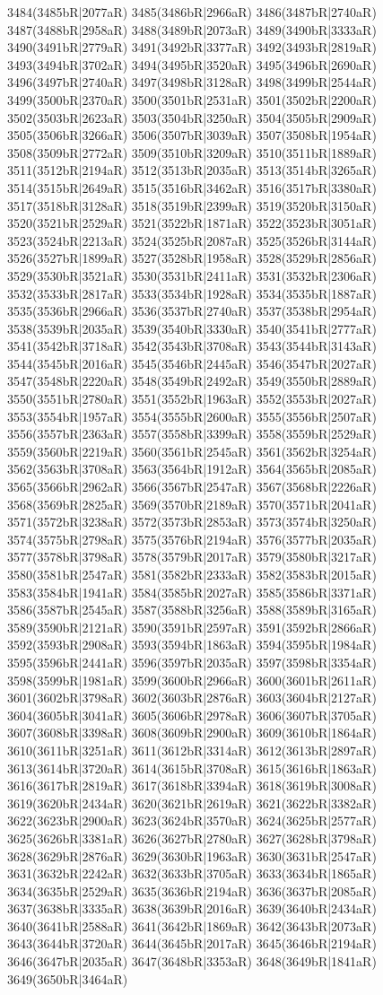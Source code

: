 3484(3485bR|2077aR) 3485(3486bR|2966aR) 3486(3487bR|2740aR) 3487(3488bR|2958aR) 3488(3489bR|2073aR) 3489(3490bR|3333aR) 3490(3491bR|2779aR) 3491(3492bR|3377aR) 3492(3493bR|2819aR) 3493(3494bR|3702aR) 3494(3495bR|3520aR) 3495(3496bR|2690aR) 3496(3497bR|2740aR) 3497(3498bR|3128aR) 3498(3499bR|2544aR) 3499(3500bR|2370aR) 3500(3501bR|2531aR) 3501(3502bR|2200aR) 3502(3503bR|2623aR) 3503(3504bR|3250aR) 3504(3505bR|2909aR) 3505(3506bR|3266aR) 3506(3507bR|3039aR) 3507(3508bR|1954aR) 3508(3509bR|2772aR) 3509(3510bR|3209aR) 3510(3511bR|1889aR) 3511(3512bR|2194aR) 3512(3513bR|2035aR) 3513(3514bR|3265aR) 3514(3515bR|2649aR) 3515(3516bR|3462aR) 3516(3517bR|3380aR) 3517(3518bR|3128aR) 3518(3519bR|2399aR) 3519(3520bR|3150aR) 3520(3521bR|2529aR) 3521(3522bR|1871aR) 3522(3523bR|3051aR) 3523(3524bR|2213aR) 3524(3525bR|2087aR) 3525(3526bR|3144aR) 3526(3527bR|1899aR) 3527(3528bR|1958aR) 3528(3529bR|2856aR) 3529(3530bR|3521aR) 3530(3531bR|2411aR) 3531(3532bR|2306aR) 3532(3533bR|2817aR) 3533(3534bR|1928aR) 3534(3535bR|1887aR) 3535(3536bR|2966aR) 3536(3537bR|2740aR) 3537(3538bR|2954aR) 3538(3539bR|2035aR) 3539(3540bR|3330aR) 3540(3541bR|2777aR) 3541(3542bR|3718aR) 3542(3543bR|3708aR) 3543(3544bR|3143aR) 3544(3545bR|2016aR) 3545(3546bR|2445aR) 3546(3547bR|2027aR) 3547(3548bR|2220aR) 3548(3549bR|2492aR) 3549(3550bR|2889aR) 3550(3551bR|2780aR) 3551(3552bR|1963aR) 3552(3553bR|2027aR) 3553(3554bR|1957aR) 3554(3555bR|2600aR) 3555(3556bR|2507aR) 3556(3557bR|2363aR) 3557(3558bR|3399aR) 3558(3559bR|2529aR) 3559(3560bR|2219aR) 3560(3561bR|2545aR) 3561(3562bR|3254aR) 3562(3563bR|3708aR) 3563(3564bR|1912aR) 3564(3565bR|2085aR) 3565(3566bR|2962aR) 3566(3567bR|2547aR) 3567(3568bR|2226aR) 3568(3569bR|2825aR) 3569(3570bR|2189aR) 3570(3571bR|2041aR) 3571(3572bR|3238aR) 3572(3573bR|2853aR) 3573(3574bR|3250aR) 3574(3575bR|2798aR) 3575(3576bR|2194aR) 3576(3577bR|2035aR) 3577(3578bR|3798aR) 3578(3579bR|2017aR) 3579(3580bR|3217aR) 3580(3581bR|2547aR) 3581(3582bR|2333aR) 3582(3583bR|2015aR) 3583(3584bR|1941aR) 3584(3585bR|2027aR) 3585(3586bR|3371aR) 3586(3587bR|2545aR) 3587(3588bR|3256aR) 3588(3589bR|3165aR) 3589(3590bR|2121aR) 3590(3591bR|2597aR) 3591(3592bR|2866aR) 3592(3593bR|2908aR) 3593(3594bR|1863aR) 3594(3595bR|1984aR) 3595(3596bR|2441aR) 3596(3597bR|2035aR) 3597(3598bR|3354aR) 3598(3599bR|1981aR) 3599(3600bR|2966aR) 3600(3601bR|2611aR) 3601(3602bR|3798aR) 3602(3603bR|2876aR) 3603(3604bR|2127aR) 3604(3605bR|3041aR) 3605(3606bR|2978aR) 3606(3607bR|3705aR) 3607(3608bR|3398aR) 3608(3609bR|2900aR) 3609(3610bR|1864aR) 3610(3611bR|3251aR) 3611(3612bR|3314aR) 3612(3613bR|2897aR) 3613(3614bR|3720aR) 3614(3615bR|3708aR) 3615(3616bR|1863aR) 3616(3617bR|2819aR) 3617(3618bR|3394aR) 3618(3619bR|3008aR) 3619(3620bR|2434aR) 3620(3621bR|2619aR) 3621(3622bR|3382aR) 3622(3623bR|2900aR) 3623(3624bR|3570aR) 3624(3625bR|2577aR) 3625(3626bR|3381aR) 3626(3627bR|2780aR) 3627(3628bR|3798aR) 3628(3629bR|2876aR) 3629(3630bR|1963aR) 3630(3631bR|2547aR) 3631(3632bR|2242aR) 3632(3633bR|3705aR) 3633(3634bR|1865aR) 3634(3635bR|2529aR) 3635(3636bR|2194aR) 3636(3637bR|2085aR) 3637(3638bR|3335aR) 3638(3639bR|2016aR) 3639(3640bR|2434aR) 3640(3641bR|2588aR) 3641(3642bR|1869aR) 3642(3643bR|2073aR) 3643(3644bR|3720aR) 3644(3645bR|2017aR) 3645(3646bR|2194aR) 3646(3647bR|2035aR) 3647(3648bR|3353aR) 3648(3649bR|1841aR) 3649(3650bR|3464aR) 